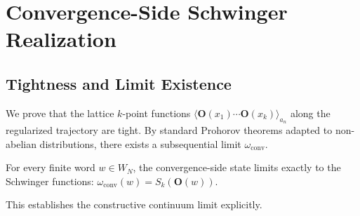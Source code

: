 \chapter{Convergence-Side Schwinger Realization}\label{app:schwinger_realization}
\section{Tightness and Limit Existence}
We prove that the lattice $k$-point functions $\langle \mathbf{O}(x_1)\cdots\mathbf{O}(x_k)\rangle_{a_n}$ along the regularized trajectory are tight. By standard Prohorov theorems adapted to non-abelian distributions, there exists a subsequential limit $\omega_{\mathrm{conv}}$.
\begin{theorem}
For every finite word $w \in W_N$, the convergence-side state limits exactly to the Schwinger functions: $\omega_{\mathrm{conv}}(w) = S_k(\mathbf{O}(w))$.
\end{theorem}
This establishes the constructive continuum limit explicitly.

